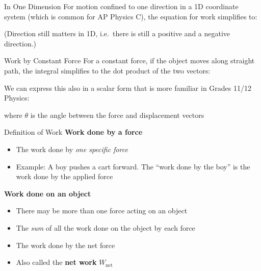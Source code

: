 \documentclass[12pt,compress,aspectratio=169]{beamer}
\begin{document}
\begin{frame}{In One Dimension}
  For motion confined to one direction in a 1D coordinate system (which is
  common for AP Physics C), the equation for work simplifies to:
  

  (Direction still matters in 1D, i.e.\ there is still a positive and a
  negative direction.)
\end{frame}



\begin{frame}{Work by Constant Force}
  For a constant force, if the object moves along straight path, the integral
  simplifies to the dot product of the two vectors:


  We can express this also in a scalar form that is more familiar in Grades
  11/12 Physics:


  where $\theta$ is the angle between the force and displacement vectors
\end{frame}



\begin{frame}{Definition of Work}
  \textbf{Work done by a force}
  \begin{itemize}
  \item The work done by \emph{one specific force}
  \item Example: A boy pushes a cart forward. The ``work done by the boy'' is
    the work done by the applied force
  \end{itemize}

  \vspace{.15in}\textbf{Work done on an object}
  \begin{itemize}
  \item There may be more than one force acting on an object
  \item The \emph{sum} of all the work done on the object by each force
  \item The work done by the net force
  \item Also called the \textbf{net work} $W_\text{net}$
  \end{itemize}
\end{frame}
\end{document}
